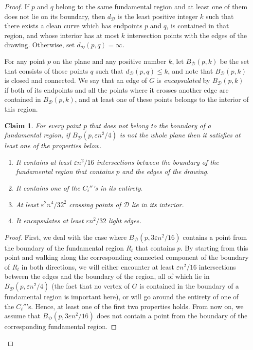 \documentclass{article}
\newcounter{contSect} \numberwithin{contSect}{section}
\newtheorem{claim}[contSect]{Claim}
\begin{document}
\begin{proof}
    If $p$ and $q$ belong to the same fundamental region and at least one of them does not lie on its boundary, then $d_\mathcal{D}$ is the least positive integer $k$ such that there exists a clean curve which has endpoints $p$ and $q$, is contained in that region, and whose interior has at most $k$ intersection points with the edges of the drawing. Otherwise, set $d_\mathcal{D}(p,q)=\infty$. 
    
    For any point $p$ on the plane and any positive number $k$, let $B_{\mathcal{D}}(p,k)$ be the set that consists of those points $q$ such that $d_\mathcal{D}(p,q)\leq k$, and note that $B_{\mathcal{D}}(p,k)$ is closed and connected. We say that an edge of $G$ is \textit{encapsulated} by $B_{\mathcal{D}}(p,k)$ if both of its endpoints and all the points where it crosses another edge are contained in $B_{\mathcal{D}}(p,k)$, and at least one of these points belongs to the interior of this region.
    
    \begin{claim}
       
     For every point $p$ that does not belong to the boundary of a fundamental region, if $B_{\mathcal{D}}(p,\varepsilon n^2/4)$ is not the whole plane then it satisfies at least one of the properties below.
    
    \begin{enumerate}
        \item It contains at least $\varepsilon n^2/16$ intersections between the boundary of the fundamental region that contains $p$ and the edges of the drawing. 

        \item It contains one of the $C_i''$'s in its entirety.

        \item At least $\varepsilon^2n^4/32^2$ crossing points of $\mathcal{D}$ lie in its interior.

        \item It encapsulates at least $\varepsilon n^2/32$ light edges.
    \end{enumerate}

    \end{claim}

\begin{proof}
    
    First, we deal with the case where $B_{\mathcal{D}}(p,3\varepsilon n^2/16)$ contains a point from the boundary of the fundamental region $R_t$ that contains $p$. By starting from this point and walking along the corresponding connected component of the boundary of $R_t$ in both directions, we will either encounter at least $\varepsilon n^2/16$ intersections between the edges and the boundary of the region, all of which lie in $B_{\mathcal{D}}(p,\varepsilon n^2/4)$ (the fact that no vertex of $G$ is contained in the boundary of a fundamental region is important here), or will go around the entirety of one of the $C_i''$'s. Hence, at least one of the first two properties holds. From now on, we assume that $B_{\mathcal{D}}(p,3\varepsilon n^2/16)$ does not contain a point from the boundary of the corresponding fundamental region.
    

\end{proof}
\end{proof}
\end{document}
